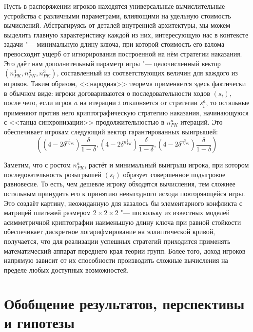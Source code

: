 Пусть в распоряжении игроков находятся универсальные вычислительные устройства с различными параметрами, влияющими на удельную стоимость вычислений. Абстрагируясь от деталей внутренней архитектуры, мы можем выделить главную характеристику каждой из них, интересующую нас в контексте задачи "--- минимальную длину ключа, при которой стоимость его взлома превосходит ущерб от игнорирования построенной на нём стратегии наказания. Это даёт нам дополнительный параметр игры "--- целочисленный вектор $(n_{PK}^1, n_{PK}^2, n_{PK}^3)$, составленный из соответствующих величин для каждого из игроков. Таким образом, <<народная>> теорема применяется здесь фактически в обычном виде: игроки договариваются о последовательности ходов $(s_i)$, после чего, если игрок $a$ на итерации $i$ отклоняется от стратегии $s^a_i$, то остальные применяют против него криптографическую стратегию наказания, начинающуюся с <<танца синхронизации>> продолжительностью в $n_{PK}^a$ итераций. Это обеспечивает игрокам следующий вектор гарантированных выигрышей:
\begin{equation*}
	((4 - 2 \delta^{n_{PK}^1}) \frac{\delta}{1-\delta}, (4 - 2 \delta^{n_{PK}^2}) \frac{\delta}{1-\delta}, (4 - 2 \delta^{n_{PK}^3}) \frac{\delta}{1-\delta})
\end{equation*}

Заметим, что с ростом $n_{PK}^a$, растёт и минимальный выигрыш игрока, при котором последовательность розыгрышей $(s_i)$ образует совершенное подыгровое равновесие. То есть, чем дешевле игроку обходятся вычисления, тем сложнее остальным принудить его к принятию невыгодного исхода повторяющейся игры. Это создаёт картину, неожиданную для казалось бы элементарного конфликта с матрицей платежей размером $2 \times 2 \times 2$ "--- поскольку из известных моделей асимметричной криптографии наименьшую длину ключа при равной стойкости обеспечивает дискретное логарифмирование на эллиптической кривой, получается, что для реализации успешных стратегий приходится применять математический аппарат переднего края теории групп. Более того, доход игроков напрямую зависит от их способности производить сложные вычисления на пределе любых доступных возможностей.

\section{Обобщение результатов, перспективы и гипотезы}\label{sec:ch3/sect4}

